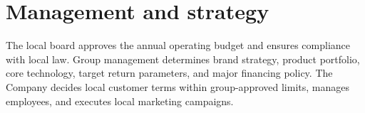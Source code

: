 \section{Management and strategy}
The local board approves the annual operating budget and ensures compliance
with local law. Group management determines brand strategy, product portfolio,
core technology, target return parameters, and major financing policy. The
Company decides local customer terms within group-approved limits, manages
employees, and executes local marketing campaigns.
